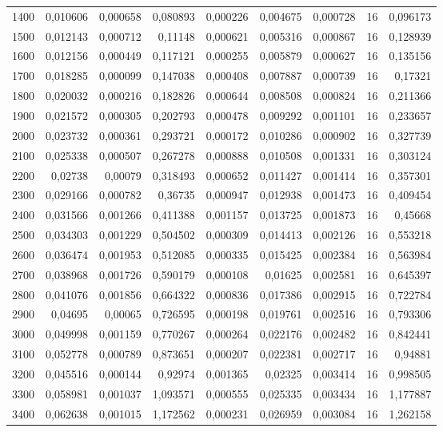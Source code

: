 \begin{tabular}{r r r r r r r r r}
1400 & 0,010606 & 0,000658 & 0,080893 & 0,000226 & 0,004675 & 0,000728 & 16 & 0,096173 \\
1500 & 0,012143 & 0,000712 & 0,11148 & 0,000621 & 0,005316 & 0,000867 & 16 & 0,128939 \\
1600 & 0,012156 & 0,000449 & 0,117121 & 0,000255 & 0,005879 & 0,000627 & 16 & 0,135156 \\
1700 & 0,018285 & 0,000099 & 0,147038 & 0,000408 & 0,007887 & 0,000739 & 16 & 0,17321 \\
1800 & 0,020032 & 0,000216 & 0,182826 & 0,000644 & 0,008508 & 0,000824 & 16 & 0,211366 \\
1900 & 0,021572 & 0,000305 & 0,202793 & 0,000478 & 0,009292 & 0,001101 & 16 & 0,233657 \\
2000 & 0,023732 & 0,000361 & 0,293721 & 0,000172 & 0,010286 & 0,000902 & 16 & 0,327739 \\
2100 & 0,025338 & 0,000507 & 0,267278 & 0,000888 & 0,010508 & 0,001331 & 16 & 0,303124 \\
2200 & 0,02738 & 0,00079 & 0,318493 & 0,000652 & 0,011427 & 0,001414 & 16 & 0,357301 \\
2300 & 0,029166 & 0,000782 & 0,36735 & 0,000947 & 0,012938 & 0,001473 & 16 & 0,409454 \\
2400 & 0,031566 & 0,001266 & 0,411388 & 0,001157 & 0,013725 & 0,001873 & 16 & 0,45668 \\
2500 & 0,034303 & 0,001229 & 0,504502 & 0,000309 & 0,014413 & 0,002126 & 16 & 0,553218 \\
2600 & 0,036474 & 0,001953 & 0,512085 & 0,000335 & 0,015425 & 0,002384 & 16 & 0,563984 \\
2700 & 0,038968 & 0,001726 & 0,590179 & 0,000108 & 0,01625 & 0,002581 & 16 & 0,645397 \\
2800 & 0,041076 & 0,001856 & 0,664322 & 0,000836 & 0,017386 & 0,002915 & 16 & 0,722784 \\
2900 & 0,04695 & 0,00065 & 0,726595 & 0,000198 & 0,019761 & 0,002516 & 16 & 0,793306 \\
3000 & 0,049998 & 0,001159 & 0,770267 & 0,000264 & 0,022176 & 0,002482 & 16 & 0,842441 \\
3100 & 0,052778 & 0,000789 & 0,873651 & 0,000207 & 0,022381 & 0,002717 & 16 & 0,94881 \\
3200 & 0,045516 & 0,000144 & 0,92974 & 0,001365 & 0,02325 & 0,003414 & 16 & 0,998505 \\
3300 & 0,058981 & 0,001037 & 1,093571 & 0,000555 & 0,025335 & 0,003434 & 16 & 1,177887 \\
3400 & 0,062638 & 0,001015 & 1,172562 & 0,000231 & 0,026959 & 0,003084 & 16 & 1,262158 \\

\end{tabular}
